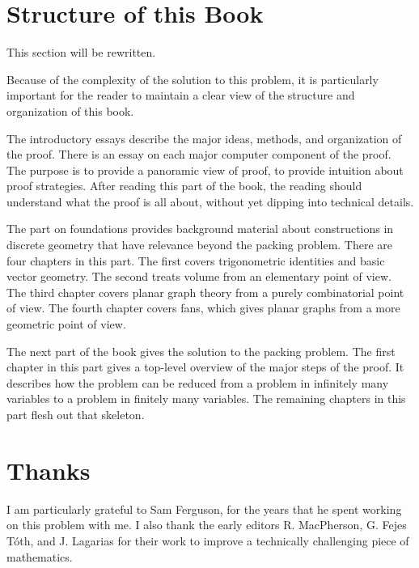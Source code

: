 \section{Structure of this Book}

\begin{note}%
This section will be rewritten.
\end{note}

Because of the complexity of the solution to this problem, it is particularly important for the reader to maintain a clear view of the structure and organization of this book. 


The introductory essays describe the major ideas,  methods, and organization of the proof.  There is an essay on each major computer component of the proof. The purpose is to provide a panoramic view of proof, to provide intuition about proof strategies.  After reading this part of the book, the reading should understand what the proof is all about, without yet dipping into technical details.  

The part on foundations provides background material about constructions in discrete geometry that have relevance beyond the packing problem.  There are four chapters in this part.  The first covers trigonometric identities and basic vector geometry.  The second treats volume from an elementary point of view.  The third chapter covers planar graph theory from a purely combinatorial point of view.  The fourth chapter covers fans, which gives planar graphs from a more geometric point of view.

The next part of the book gives the solution to the packing problem.  The first chapter in this part gives a top-level overview of the major steps of the proof.  It describes how the problem can be reduced from a problem in infinitely many variables to a problem in finitely many variables.  The remaining chapters in this part flesh out that skeleton.






\section{Thanks}

I am particularly grateful to Sam Ferguson, for the years that
he spent working on this problem with me.  I also thank the early editors
R. MacPherson, G. Fejes T\'oth, and J. Lagarias for their work
to improve a technically challenging piece of mathematics.  

